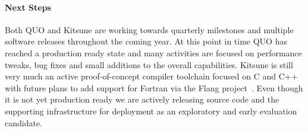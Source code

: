 \paragraph{Next Steps}
Both QUO and Kitsune are working towards quarterly milestones and multiple software 
releases throughout the coming year.  At this point in time QUO has reached a production 
ready state and many activities are focused on performance tweaks, bug fixes and small 
additions to the overall capabilities. Kitsune is still very much an active 
proof-of-concept compiler toolchain focused on C and C++ with future plans to add support
for Fortran via the Flang project~\cite{Flang:2018}.  Even though it is not yet production
ready we are actively releasing source code and the supporting infrastructure for 
deployment as an exploratory and early evaluation candidate. 

